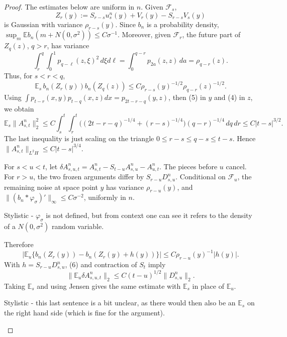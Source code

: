 \documentclass[12pt]{article}
\newcommand{\E}{\mathbb E}
\newcommand{\1}{\mathbf 1}
\newcommand{\calF}{\mathcal F}
\newcommand{\review}[1]{\begin{reviewbox}#1\end{reviewbox}}
\begin{document}
\begin{proof}
The estimates below are uniform in \(n\).  Given \(\calF_s\),
\[
Z_r(y):=S_{r-s}u_s^n(y)+V_r(y)-S_{r-s}V_s(y)
\]
is Gaussian with variance \(\rho_{r-s}(y)\).  Since \(b_n\) is a probability
density, \(\sup_m\E b_n(m+N(0,\sigma^2))\le C\sigma^{-1}\).  Moreover, given
\(\calF_r\), the future part of \(Z_q(z)\), \(q>r\), has variance
\[
 \int_r^q\!\!\int_0^1p_{q-\ell}(z,\xi)^2\,d\xi d\ell
 =\int_0^{q-r}p_{2a}(z,z)\,da=\rho_{q-r}(z).
\]
Thus, for \(s<r<q\),
\[
 \E_s\,b_n(Z_r(y))b_n(Z_q(z))
 \le C\rho_{r-s}(y)^{-1/2}\rho_{q-r}(z)^{-1/2}.              \tag{9}
\]
Using
\(\int p_{t-r}(x,y)p_{t-q}(x,z)dx=p_{2t-r-q}(y,z)\), then (5) in \(y\) and
(4) in \(z\), we obtain
\[
 \E_s\|A^n_{s,t}\|_2^2
 \le C\!\int_s^t\!\!\int_r^t
      \bigl((2t-r-q)^{-1/4}+(r-s)^{-1/4}\bigr)(q-r)^{-1/4}\,dq\,dr
 \le C|t-s|^{3/2}.                                          \tag{10}
\]
The last inequality is just scaling on the triangle
\(0\le r-s\le q-s\le t-s\).  Hence
\(\|A^n_{s,t}\|_{L^2H}\le C|t-s|^{3/4}\).

For \(s<u<t\), let
\(\delta A^n_{s,u,t}=A^n_{s,t}-S_{t-u}A^n_{s,u}-A^n_{u,t}\).  The pieces before
\(u\) cancel.  For \(r>u\), the two frozen arguments differ by
\(S_{r-u}D^n_{s,u}\).  Conditional on \(\calF_u\), the remaining noise at
space point \(y\) has variance \(\rho_{r-u}(y)\), and
\(\|(b_n*\varphi_\sigma)'\|_\infty\le C\sigma^{-2}\), uniformly in \(n\).
\review{Stylistic - $\varphi_\sigma$ is not defined, but from context one can see it refers to the density of a $N(0,\sigma^2)$ random variable.}
Therefore
\[
 \left|\E_u\{b_n(Z_r(y))-b_n(Z_r(y)+h(y))\}\right|
      \le C\rho_{r-u}(y)^{-1}|h(y)|.
\]
With \(h=S_{r-u}D^n_{s,u}\), (6) and contraction of \(S_t\) imply
\[
        \|\E_u\delta A^n_{s,u,t}\|_2
        \le C(t-u)^{1/2}\|D^n_{s,u}\|_2 .                    \tag{11}
\]
Taking \(\E_s\) and using Jensen gives the same estimate with \(\E_s\) in
place of \(\E_u\). \review{Stylistic - this last sentence is a bit unclear, as there would then also be an $\E_s$ on the right hand side (which is fine for the argument). }


\end{proof}
\end{document}
